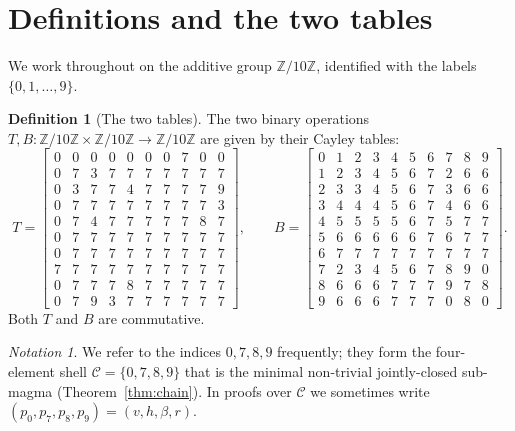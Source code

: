 \documentclass[11pt,reqno]{amsart}
\theoremstyle{plain}
\theoremstyle{definition}
\newtheorem{definition}[theorem]{Definition}
\theoremstyle{remark}
\newtheorem*{notation}{Notation}
\newcommand{\Z}{\mathbb{Z}}
\newcommand{\Zten}{\Z/10\Z}
\newcommand{\Cfour}{\mathcal{C}}
\begin{document}
\section{Definitions and the two tables}\label{sec:setup}

We work throughout on the additive group $\Zten$, identified with
the labels $\{0,1,\dots,9\}$.

\begin{definition}[The two tables]\label{def:tables}
The two binary operations $T,B:\Zten\times\Zten\to\Zten$ are
given by their Cayley tables:
\[
T = \left[
\begin{array}{*{10}{c}}
0 & 0 & 0 & 0 & 0 & 0 & 0 & 7 & 0 & 0 \\
0 & 7 & 3 & 7 & 7 & 7 & 7 & 7 & 7 & 7 \\
0 & 3 & 7 & 7 & 4 & 7 & 7 & 7 & 7 & 9 \\
0 & 7 & 7 & 7 & 7 & 7 & 7 & 7 & 7 & 3 \\
0 & 7 & 4 & 7 & 7 & 7 & 7 & 7 & 8 & 7 \\
0 & 7 & 7 & 7 & 7 & 7 & 7 & 7 & 7 & 7 \\
0 & 7 & 7 & 7 & 7 & 7 & 7 & 7 & 7 & 7 \\
7 & 7 & 7 & 7 & 7 & 7 & 7 & 7 & 7 & 7 \\
0 & 7 & 7 & 7 & 8 & 7 & 7 & 7 & 7 & 7 \\
0 & 7 & 9 & 3 & 7 & 7 & 7 & 7 & 7 & 7
\end{array}
\right],\qquad
B = \left[
\begin{array}{*{10}{c}}
0 & 1 & 2 & 3 & 4 & 5 & 6 & 7 & 8 & 9 \\
1 & 2 & 3 & 4 & 5 & 6 & 7 & 2 & 6 & 6 \\
2 & 3 & 3 & 4 & 5 & 6 & 7 & 3 & 6 & 6 \\
3 & 4 & 4 & 4 & 5 & 6 & 7 & 4 & 6 & 6 \\
4 & 5 & 5 & 5 & 5 & 6 & 7 & 5 & 7 & 7 \\
5 & 6 & 6 & 6 & 6 & 6 & 7 & 6 & 7 & 7 \\
6 & 7 & 7 & 7 & 7 & 7 & 7 & 7 & 7 & 7 \\
7 & 2 & 3 & 4 & 5 & 6 & 7 & 8 & 9 & 0 \\
8 & 6 & 6 & 6 & 7 & 7 & 7 & 9 & 7 & 8 \\
9 & 6 & 6 & 6 & 7 & 7 & 7 & 0 & 8 & 0
\end{array}
\right].
\]
Both $T$ and $B$ are commutative.
\end{definition}

\begin{notation}
We refer to the indices $0,7,8,9$ frequently; they form the
four-element shell $\Cfour=\{0,7,8,9\}$ that is the minimal
non-trivial jointly-closed sub-magma (Theorem~\ref{thm:chain}). In
proofs over $\Cfour$ we sometimes write
$(p_{0},p_{7},p_{8},p_{9})=(v,h,\beta,r)$.
\end{notation}
\end{document}
